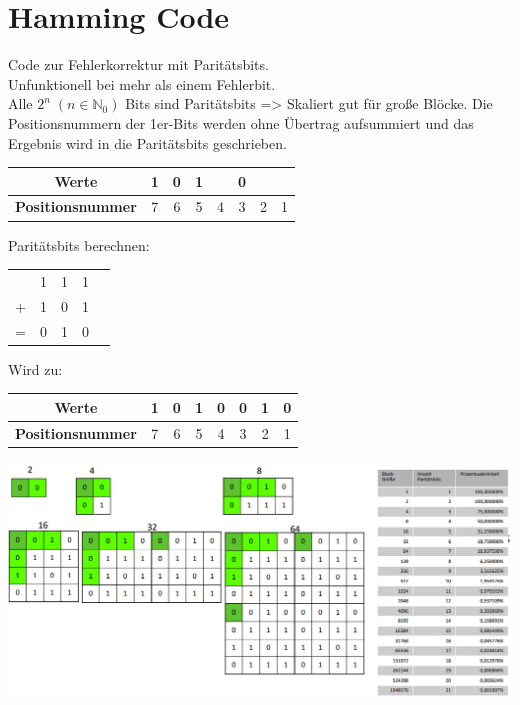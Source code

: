 \documentclass[12pt,a4paper]{article}
\begin{document}
\section{Hamming Code}
	Code zur Fehlerkorrektur mit Paritätsbits.\\
	Unfunktionell bei mehr als einem Fehlerbit.\\
	Alle $2^n \; (n \in \mathbb{N}_0)$ Bits sind Paritätsbits => Skaliert gut für große Blöcke.
	Die Positionsnummern der 1er-Bits werden ohne Übertrag aufsummiert und das Ergebnis wird in die Paritätsbits geschrieben.
	\begin{center}
		\begin{tabular}{ |c|c|c|c|c|c|c|c| } 
		 \hline
		 \textbf{Werte} & 1 & 0 & 1 &  & 0 &  & \\ 
		 \hline
		 \textbf{Positionsnummer} & \color{green}7 & 6 & \color{blue}5 & 4 & 3 & 2 & 1\\ 
		 \hline
		\end{tabular}
	\end{center}
	Paritätsbits berechnen:
	\begin{center}
		\begin{tabular}{ c c c c c } 
		  & \color{green}1 & \color{green}1 & \color{green}1 & \\ 
		  + & \color{blue}1 & \color{blue}0 & \color{blue}1 &  \\ 
		 \hline
		 = & \color{red}0 & \color{red}1 & \color{red}0 &  \\ 
		\end{tabular}
	\end{center}
	Wird zu:
	\begin{center}
		\begin{tabular}{ |c|c|c|c|c|c|c|c| } 
		 \hline
		 \textbf{Werte} & 1 & 0 & 1 & \color{red}0 & 0 & \color{red}1 & \color{red}0\\ 
		 \hline
		 \textbf{Positionsnummer} & 7 & 6 & 5 & 4 & 3 & 2 & 1\\ 
		 \hline
		\end{tabular}
	\end{center}
	
	\includegraphics[width=\textwidth]{Bilder/hamming_code-removedBg.png}
\end{document}
